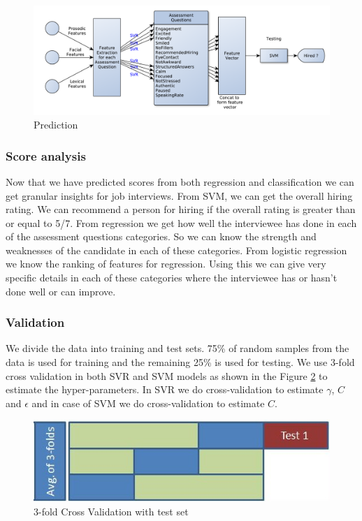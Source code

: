 \documentclass[11pt]{article}
\begin{document}
\begin{figure}[h!]
\begin{center}
\includegraphics[width=1\columnwidth]{figures/methodology.pdf}
\caption{Prediction}
\label{fig:methodology}
\end{center}
\end{figure}

\subsubsection{Score analysis}
Now that we have predicted scores from both regression and classification we can get granular insights for job interviews. From SVM, we can get the overall hiring rating. We can recommend a person for hiring if the overall rating is greater than or equal to 5/7. From regression we get how well the interviewee has done in each of the assessment questions categories. So we can know the strength and weaknesses of the candidate in each of these categories. From logistic regression we know the ranking of features for regression. Using this we can give very specific details in each of these categories where the interviewee has or hasn’t done well or can improve. 

\subsubsection{Validation}
We divide the data into training and test sets. 75\% of random samples from the data is used for training and the remaining 25\% is used for testing. We use 3-fold cross validation in both SVR and SVM models as shown in the Figure \ref{fig:validation} to estimate the hyper-parameters. In SVR we do cross-validation to estimate $\gamma$, $C$ and $\epsilon$ and in case of SVM we do cross-validation to estimate $C$.
\begin{figure}[H]
\begin{center}
\includegraphics[width=0.6\columnwidth]{figures/validation.jpeg}
\caption{3-fold Cross Validation with test set}
\label{fig:validation}
\end{center}
\end{figure}
\end{document}
